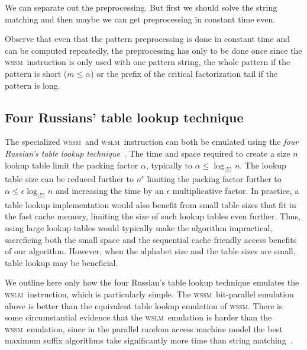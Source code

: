 \documentclass[12pt]{article}
\newcommand{\C}{{\alpha}}
\newcommand{\wssm}{\textsc{wssm}}
\newcommand{\wslm}{\textsc{wslm}}
\begin{document}
We can separate out the preprocessing. But first we should solve
the string matching and then maybe we can get preprocessing in
constant time even.


Observe that even that the pattern preprocessing
is done in constant time and can be computed
repeatedly, the preprocessing has only to be done once
since the \wssm\ instruction is only
used with one pattern string, the whole pattern if the
pattern is short ($m\leq \C$)
or the prefix of the critical factorization tail if the
pattern is long.












\subsection{Four Russians' table lookup technique}
The specialized \wssm\ and \wslm\ instruction can both be emulated
using the {\em four Russian's table lookup technique}~\cite{four-rus:70}.
The time and space required to create a size $n$ lookup table limit
the packing factor $\C$, typically to $\C \leq \log_{|\Sigma|} n$.
The lookup table size can be reduced further to $n^\epsilon$ limiting
the packing factor further to $\C \leq \epsilon \log_{|\Sigma|} n$
and increasing the time by an $\epsilon$ multiplicative factor.
In practice, a table lookup implementation would also benefit
from small table sizes that fit in the fast cache memory, 
limiting the size of such lookup tables even further.
Thus, using large lookup tables would typically make the algorithm impractical,
sacreficing both the small space and the sequential cache 
friendly access benefits of our algorithm.
However, when the alphabet size and the table sizes
are small, table lookup may be beneficial.

We outline here only how the four Russian's table lookup technique
emulates the \wslm\ instruction, which is particularly simple.
The \wssm\ bit-parallel emulation above is better than the
equivalent table lookup emulation of \wssm. 
There is some circumstantial evidence that the \wslm\ emulation
is harder than the \wssm\ emulation, since 
in the parallel random access machine model the best maximum suffix algorithms
take significantly more time than string matching~\cite{ac:91,dis:94,is-canonical:92}.
\end{document}
